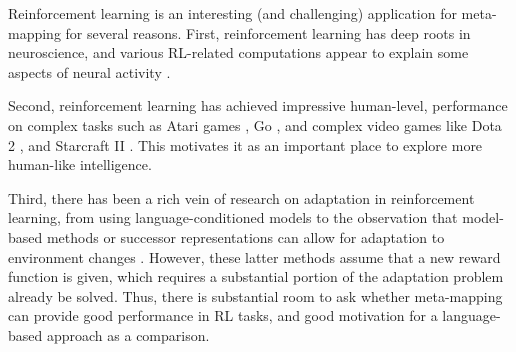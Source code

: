 Reinforcement learning is an interesting (and challenging) application for meta-mapping for several reasons. First, reinforcement learning has deep roots in neuroscience, and various RL-related computations appear to explain some aspects of neural activity \citep{Sutton2017, Niv2009, Odoherty2003, Dabney2020}.\par 
Second, reinforcement learning has achieved impressive human-level, performance on complex tasks such as Atari games \citep{Mnih2015}, Go \citep{Silver2016, Silver2017}, and complex video games like Dota 2 \citep{OpenAI2019}, and Starcraft II \citep{Vinyals2019}. This motivates it as an important place to explore more human-like intelligence. \par 
Third, there has been a rich vein of research on adaptation in reinforcement learning, from using language-conditioned models \citep{Hermann2017} to the observation that model-based methods or successor representations can allow for adaptation to environment changes \citep{Daw2014, Momennejad2017}. However, these latter methods assume that a new reward function is given, which requires a substantial portion of the adaptation problem already be solved. Thus, there is substantial room to ask whether meta-mapping can provide good performance in RL tasks, and good motivation for a language-based approach as a comparison. \par 

